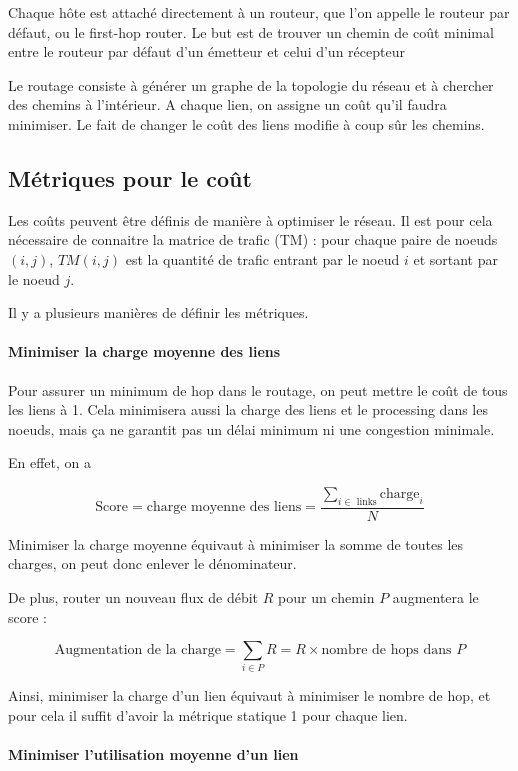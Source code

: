 Chaque hôte est attaché directement à un routeur, que l'on appelle le routeur par défaut, ou le first-hop router. Le but est de trouver un chemin de coût minimal entre le routeur par défaut d'un émetteur et celui d'un récepteur

Le routage consiste à générer un graphe de la topologie du réseau et à chercher des chemins à l'intérieur. A chaque lien, on assigne un coût qu'il faudra minimiser. Le fait de changer le coût des liens modifie à coup sûr les chemins.

	\subsection{Métriques pour le coût}

	Les coûts peuvent être définis de manière à optimiser le réseau. Il est pour cela nécessaire de connaitre la matrice de trafic (TM) : pour chaque paire de noeuds $(i, j)$, $TM(i, j)$ est la quantité de trafic entrant par le noeud $i$ et sortant par le noeud $j$.

Il y a plusieurs manières de définir les métriques.

	\paragraph{Minimiser la charge moyenne des liens}

	Pour assurer un minimum de hop dans le routage, on peut mettre le coût de tous les liens à 1. Cela minimisera aussi la charge des liens et le processing dans les noeuds, mais ça ne garantit pas un délai minimum ni une congestion minimale.

	En effet, on a 

	$$\text{Score} = \text{charge moyenne des liens} = \frac{\sum_{i \in \text{ links}} \text{charge}_i}{N} $$

	Minimiser la charge moyenne équivaut à minimiser la somme de toutes les charges, on peut donc enlever le dénominateur.

	De plus, router un nouveau flux de débit $R$ pour un chemin $P$ augmentera le score :

	$$\text{Augmentation de la charge} = \sum_{i \in P} R = R \times \text{nombre de hops dans } P$$

	Ainsi, minimiser la charge d'un lien équivaut à minimiser le nombre de hop, et pour cela il suffit d'avoir la métrique statique 1 pour chaque lien.


	\paragraph{Minimiser l'utilisation moyenne d'un lien}
	

